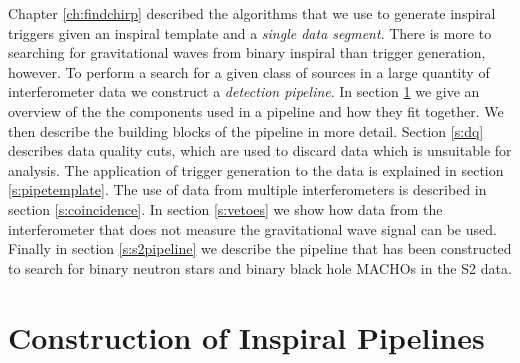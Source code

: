 
Chapter \ref{ch:findchirp} described the algorithms that we use to generate
inspiral triggers given an inspiral template and a \emph{single data segment}.  There
is more to searching for gravitational waves from binary inspiral than trigger
generation, however. To perform a search for a given class of sources in a
large quantity of interferometer data we construct a \emph{detection
pipeline}.  In section \ref{s:construction} we give an overview of the
the components used in a pipeline and how they fit together.
We then describe the building blocks of the pipeline in more detail. Section
\ref{s:dq} describes data quality cuts, which are used to discard 
data which is unsuitable for analysis. The application of trigger generation
to the data is explained in section \ref{s:pipetemplate}. The use of data from
multiple interferometers is described in section \ref{s:coincidence}. In
section \ref{s:vetoes} we show how data from the interferometer that does not
measure the gravitational wave signal can be used.  Finally in section
\ref{s:s2pipeline} we describe the pipeline that has been constructed to
search for binary neutron stars and binary black hole MACHOs in the S2 data.

\section{Construction of Inspiral Pipelines}
\label{s:construction}

